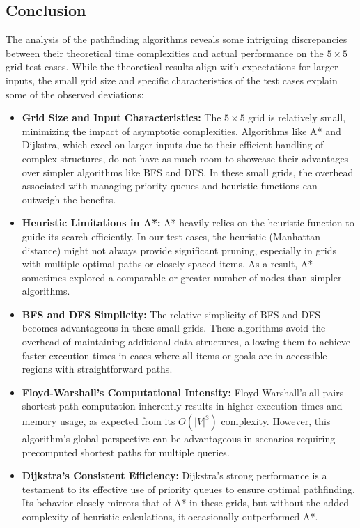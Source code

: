 \documentclass[12pt]{article}
\begin{document}
\subsection{Conclusion}
The analysis of the pathfinding algorithms reveals some intriguing discrepancies between their theoretical time complexities and actual performance on the \( 5 \times 5 \) grid test cases. While the theoretical results align with expectations for larger inputs, the small grid size and specific characteristics of the test cases explain some of the observed deviations:

\begin{itemize}
    \item \textbf{Grid Size and Input Characteristics:} The \( 5 \times 5 \) grid is relatively small, minimizing the impact of asymptotic complexities. Algorithms like A* and Dijkstra, which excel on larger inputs due to their efficient handling of complex structures, do not have as much room to showcase their advantages over simpler algorithms like BFS and DFS. In these small grids, the overhead associated with managing priority queues and heuristic functions can outweigh the benefits.
    
    \item \textbf{Heuristic Limitations in A*:} A* heavily relies on the heuristic function to guide its search efficiently. In our test cases, the heuristic (Manhattan distance) might not always provide significant pruning, especially in grids with multiple optimal paths or closely spaced items. As a result, A* sometimes explored a comparable or greater number of nodes than simpler algorithms.

    \item \textbf{BFS and DFS Simplicity:} The relative simplicity of BFS and DFS becomes advantageous in these small grids. These algorithms avoid the overhead of maintaining additional data structures, allowing them to achieve faster execution times in cases where all items or goals are in accessible regions with straightforward paths.

    \item \textbf{Floyd-Warshall's Computational Intensity:} Floyd-Warshall's all-pairs shortest path computation inherently results in higher execution times and memory usage, as expected from its \( O(|V|^3) \) complexity. However, this algorithm's global perspective can be advantageous in scenarios requiring precomputed shortest paths for multiple queries.

    \item \textbf{Dijkstra’s Consistent Efficiency:} Dijkstra's strong performance is a testament to its effective use of priority queues to ensure optimal pathfinding. Its behavior closely mirrors that of A* in these grids, but without the added complexity of heuristic calculations, it occasionally outperformed A*.


\end{itemize}
\end{document}
